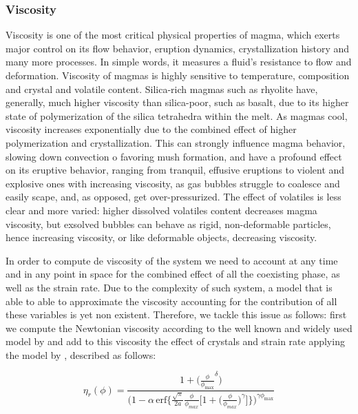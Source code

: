 \subsubsection{Viscosity}
Viscosity is one of the most critical physical properties of magma, which exerts major control on its flow behavior, eruption dynamics, crystallization history and many more processes. In simple words, it measures a fluid's resistance to flow and deformation. Viscosity of magmas is highly sensitive to temperature, composition and crystal and volatile content. Silica-rich magmas such as rhyolite have, generally, much higher viscosity than silica-poor, such as basalt, due to its higher state of polymerization of the silica tetrahedra within the melt. As magmas cool, viscosity increases exponentially due to the combined effect of higher polymerization and crystallization. This can strongly influence magma behavior, slowing down convection o favoring mush formation, and have a profound effect on its eruptive behavior, ranging from tranquil, effusive eruptions to violent and explosive ones with increasing viscosity, as gas bubbles struggle to coalesce and easily scape, and, as opposed, get over-pressurized. The effect of volatiles is less clear and more varied: higher dissolved volatiles content decreases magma viscosity, but exsolved bubbles can behave as rigid, non-deformable particles, hence increasing viscosity, or like deformable objects, decreasing viscosity.

In order to compute de viscosity of the system we need to account at any time and in any point in space for the combined effect of all the coexisting phase, as well as the strain rate. Due to the complexity of such system, a model that is able to able to approximate the viscosity accounting for the contribution of all these variables is yet non existent. Therefore, we tackle this issue as follows: first we compute the Newtonian viscosity according to the well known and widely used model by \cite{giordano200} and add to this viscosity the effect of crystals and strain rate applying the model by \cite{caricchi2007}, described as follows:

\begin{equation}
	\eta_r(\phi) = \frac{1 + \big(\frac{\phi}{\phi_{\text{max}}}^{\delta}\big)}
	{\bigg(1 - \alpha \, \text{erf} \bigg\{ \frac{\sqrt{\pi}}{2a} \frac{\phi}{\phi_{max}}
		\bigg[ 1 + \bigg(\frac{\phi}{\phi_{max}}\bigg)^\gamma \bigg] \bigg\}\bigg)^{\gamma \phi_{\text{max}}}}
\end{equation}

